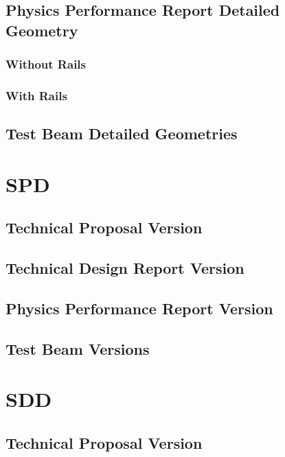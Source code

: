 \subsection{Physics Performance Report Detailed Geometry}

\subsubsection{Without Rails}

\subsubsection{With Rails}

\subsection{Test Beam Detailed Geometries}

\section{SPD}

\subsection{Technical Proposal Version}

\subsection{Technical Design Report Version}

\subsection{Physics Performance Report Version}

\subsection{Test Beam Versions}

\section{SDD}

\subsection{Technical Proposal Version}

